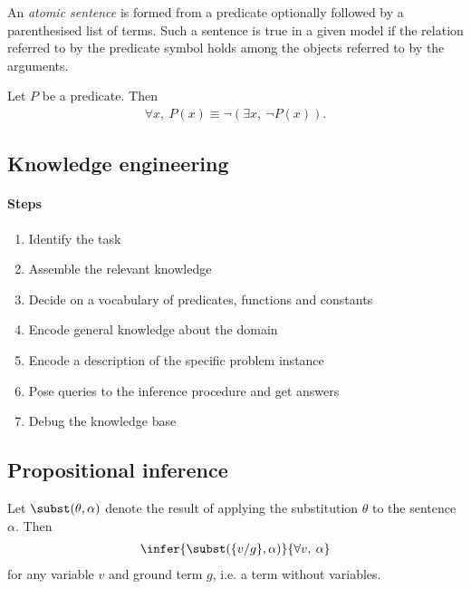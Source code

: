 \documentclass{article}
\begin{document}
\begin{definition}
    An \emph{atomic sentence} is formed from a predicate optionally followed
    by a parenthesised list of terms. Such a sentence is true in a given model
    if the relation referred to by the predicate symbol holds among the objects
    referred to by the arguments.
\end{definition}

\begin{theorem}
    Let $P$ be a predicate. Then
    \begin{align*}
        \forall x,\: P(x) \equiv \neg(\exists x,\: \neg P(x)).
    \end{align*}
\end{theorem}

\subsection{Knowledge engineering}

\paragraph{Steps}
\begin{enumerate}
    \item Identify the task 
    \item Assemble the relevant knowledge
    \item Decide on a vocabulary of predicates, functions and constants
    \item Encode general knowledge about the domain
    \item Encode a description of the specific problem instance
    \item Pose queries to the inference procedure and get answers
    \item Debug the knowledge base
\end{enumerate}

\subsection{Propositional inference}

\begin{theorem}
    Let $\subst(\theta, \alpha)$ denote the result of applying
    the substitution $\theta$ to the sentence $\alpha$. Then
    \begin{align*}
        \infer{\subst(\{v/g\},\alpha)}{\forall v,\:\alpha}
    \end{align*}
    for any variable $v$ and ground term $g$, i.e. a term without variables.
\end{theorem}
\end{document}
